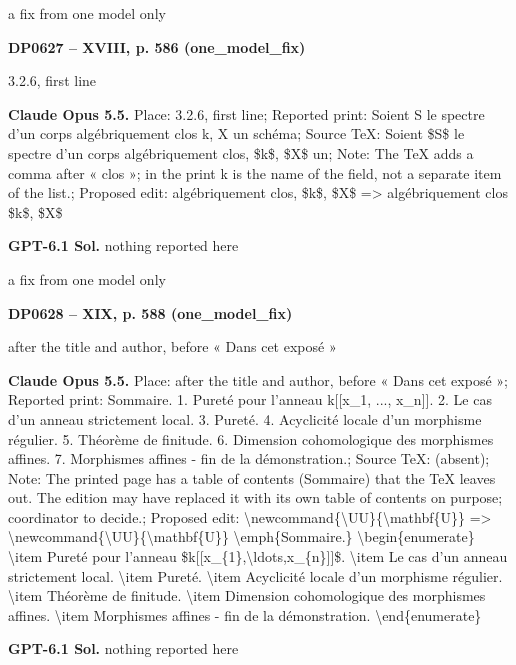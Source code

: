 a fix from one model only\par
\par\noindent\hypertarget{DP0627}{}\textbf{DP0627 -- XVIII, p. 586 (one\_model\_fix)}\par
3.2.6, first line\par
\textbf{Claude Opus 5.5.} Place: 3.2.6, first line; Reported print: Soient S le spectre d'un corps algébriquement clos k, X un schéma; Source TeX: Soient \$S\$ le spectre d'un corps algébriquement clos, \$k\$, \$X\$ un; Note: The TeX adds a comma after « clos »; in the print k is the name of the field, not a separate item of the list.; Proposed edit: algébriquement clos, \$k\$, \$X\$ =\allowbreak > algébriquement clos \$k\$, \$X\$\par
\textbf{GPT-6.1 Sol.} nothing reported here\par
a fix from one model only\par
\par\noindent\hypertarget{DP0628}{}\textbf{DP0628 -- XIX, p. 588 (one\_model\_fix)}\par
after the title and author, before « Dans cet exposé »\par
\textbf{Claude Opus 5.5.} Place: after the title and author, before « Dans cet exposé »; Reported print: Sommaire. 1. Pureté pour l'anneau k[[x\_1, ..., x\_n]]. 2. Le cas d'un anneau strictement local. 3. Pureté. 4. Acyclicité locale d'un morphisme régulier. 5. Théorème de finitude. 6. Dimension cohomologique des morphismes affines. 7. Morphismes affines - fin de la démonstration.; Source TeX: (absent); Note: The printed page has a table of contents (Sommaire) that the TeX leaves out. The edition may have replaced it with its own table of contents on purpose; coordinator to decide.; Proposed edit: \textbackslash{}newcommand\{\textbackslash{}UU\}\{\textbackslash{}mathbf\{U\}\} =\allowbreak > \textbackslash{}newcommand\{\textbackslash{}UU\}\{\textbackslash{}mathbf\{U\}\}  \textbackslash{}emph\{Sommaire.\} \textbackslash{}begin\{enumerate\} \textbackslash{}item Pureté pour l'anneau \$k[[x\_\{1\},\textbackslash{}ldots,x\_\{n\}]]\$. \textbackslash{}item Le cas d'un anneau strictement local. \textbackslash{}item Pureté. \textbackslash{}item Acyclicité locale d'un morphisme régulier. \textbackslash{}item Théorème de finitude. \textbackslash{}item Dimension cohomologique des morphismes affines. \textbackslash{}item Morphismes affines - fin de la démonstration. \textbackslash{}end\{enumerate\}\par
\textbf{GPT-6.1 Sol.} nothing reported here\par

